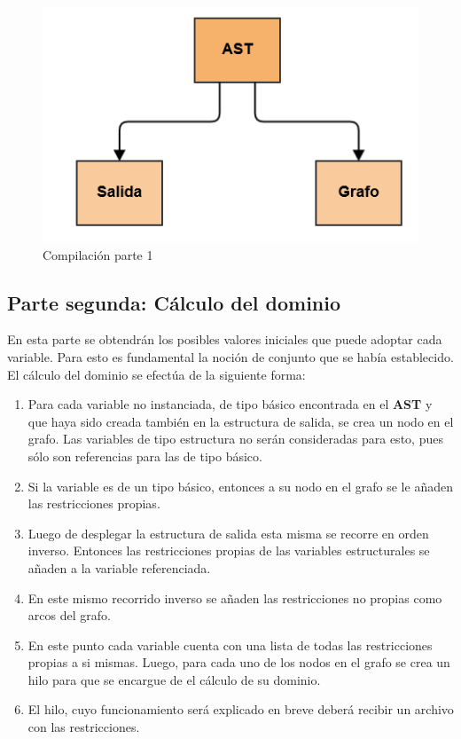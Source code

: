 \begin{figure}[h]
	\begin{center}
		\includegraphics[scale=0.55]{imagenes/Compilacion_parte_1.png}
	\end{center}
	\caption{
		\label{fig:compilacion_part_1}
		Compilación parte 1
	}
\end{figure}

\subsection{Parte segunda: Cálculo del dominio} \label{solver:dom}
En esta parte se obtendrán los posibles valores iniciales que puede adoptar cada 
variable. Para esto es fundamental la noción de conjunto que se había establecido.
El cálculo del dominio se efectúa de la siguiente forma:
\begin{enumerate}
 \item {Para cada variable no instanciada, de tipo básico encontrada en el \textbf{AST} y
  que haya sido creada también en la estructura de salida, se crea un nodo en el 
  grafo. Las variables de tipo estructura no serán consideradas para esto, pues sólo son 
  referencias para las de tipo básico.}
 \item {Si la variable es de un tipo básico, entonces a su nodo en el grafo se le 
  añaden las restricciones propias.}
 \item {Luego de desplegar la estructura de salida esta misma se recorre en orden 
  inverso. Entonces las restricciones propias de las variables estructurales se 
  añaden a la variable referenciada.}
 \item {En este mismo recorrido inverso se añaden las restricciones no propias 
  como arcos del grafo.}
 \item {En este punto cada variable cuenta con una lista de todas las restricciones 
  propias a si mismas. Luego, para cada uno de los nodos en el grafo se crea un hilo 
  para que se encargue de el cálculo de su dominio.}
 \item {El hilo, cuyo funcionamiento será explicado en breve deberá recibir  
  un archivo con las restricciones.}
\end{enumerate}

